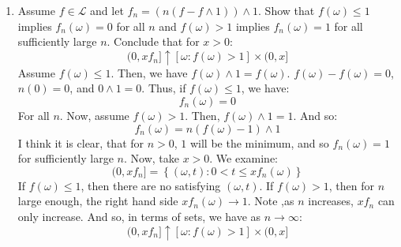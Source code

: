 \documentclass[12pt,a4paper]{article}
\newcommand{\1}[1]{\mathbbm{1}\left\{ #1 \right\}}
\newcommand{\lcal}{\mathcal{L}}
\begin{document}
\begin{enumerate}
	\item Assume $f \in \lcal$ and let $f_n = (n(f - f \wedge 1)) \wedge 1$. Show that $f(\omega) \leq 1$ implies $f_n(\omega) = 0$ for all $n$ and $f(\omega) > 1$ implies $f_n(\omega) = 1$ for all sufficiently large $n$. Conclude that for $x > 0$:
	$$
		(0, xf_n] \uparrow [\omega: f(\omega) > 1] \times (0, x]
	$$
	Assume $f(\omega) \leq 1$. Then, we have $f(\omega) \wedge 1 = f(\omega)$. $f(\omega) - f(\omega) = 0$, $n(0) = 0$, and $0 \wedge 1 = 0$. Thus, if $f(\omega) \leq 1$, we have:
	$$
		f_n(\omega) = 0
	$$
	For all $n$. Now, assume $f(\omega) > 1$. Then, $f(\omega) \wedge 1 = 1$. And so:
	$$
		f_n(\omega) = n(f(\omega) - 1) \wedge 1
	$$
	I think it is clear, that for $n > 0$, $1$ will be the minimum, and so $f_n(\omega) = 1$ for sufficiently large $n$. Now, take $x > 0$. We examine:
	$$
		(0, xf_n] = \left\{(\omega, t) : 0 < t \leq xf_n(\omega)\right\}
	$$
	If $f(\omega) \leq 1$, then there are no satisfying $(\omega, t)$. If $f(\omega) > 1$, then for $n$ large enough, the right hand side $xf_n(\omega) \to 1$. Note ,as $n$ increases, $xf_n$ can only increase. And so, in terms of sets, we have as $n \to \infty$:
	$$
		(0, xf_n] \uparrow \left[\omega : f(\omega) > 1\right] \times (0, x]
	$$
	

\end{enumerate}
\end{document}
